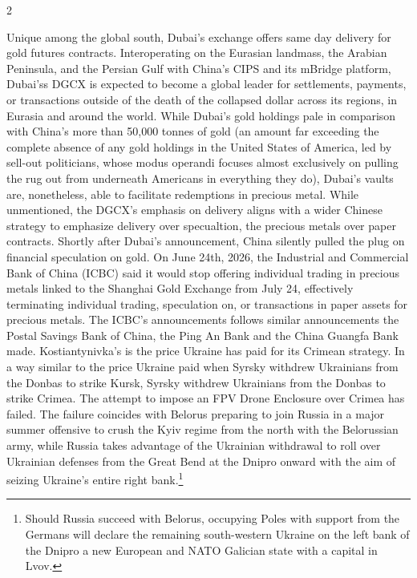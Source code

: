 \documentclass[10pt,a4paper,twoside]{article} %
\begin{document}
\begin{multicols}{2}
{{\newline \indent Unique among the global south, Dubai's exchange offers same day delivery for gold futures contracts. Interoperating on the Eurasian landmass, the Arabian Peninsula, and the Persian Gulf with China's CIPS and its mBridge platform, Dubai'ss DGCX is expected to become a global leader for settlements, payments, or transactions outside of the death of the collapsed dollar across its regions, in Eurasia and around the world. While Dubai's gold holdings pale in comparison with China's more than 50,000 tonnes of gold (an amount far exceeding the complete absence of any gold holdings in the United States of America, led by sell-out politicians, whose modus operandi focuses almost exclusively on pulling the rug out from underneath Americans in everything they do), Dubai's vaults are, nonetheless, able to facilitate redemptions in precious metal. While unmentioned, the DGCX's emphasis on delivery aligns with a wider Chinese strategy to emphasize delivery over specualtion, the precious metals over paper contracts. Shortly after Dubai's announcement, China silently pulled the plug on financial speculation on gold. On June 24th, 2026, the Industrial and Commercial Bank of China (ICBC) said it would stop offering individual trading in precious metals linked to the Shanghai Gold Exchange from July 24, effectively terminating individual trading, speculation on, or transactions in paper assets for precious metals. The ICBC’s announcements follows similar announcements the Postal Savings Bank of China, the Ping An Bank and the China Guangfa Bank made.} Kostiantynivka's is the price Ukraine has paid for its Crimean strategy. In a way similar to the price Ukraine paid when Syrsky withdrew Ukrainians from the Donbas to strike Kursk, Syrsky withdrew Ukrainians from the Donbas to strike Crimea. The attempt to impose an FPV Drone Enclosure over Crimea has failed. The failure coincides with Belorus preparing to join Russia in a major summer offensive to crush the Kyiv regime from the north with the Belorussian army, while Russia takes advantage of the Ukrainian withdrawal to roll over Ukrainian defenses from the Great Bend at the Dnipro onward with the aim of seizing Ukraine's entire right bank.\footnote{Should Russia succeed with Belorus, occupying Poles with support from the Germans will declare the remaining south-western Ukraine on the left bank of the Dnipro a new European and NATO Galician state with a capital in Lvov.}

}




\end{multicols}
\end{document}
